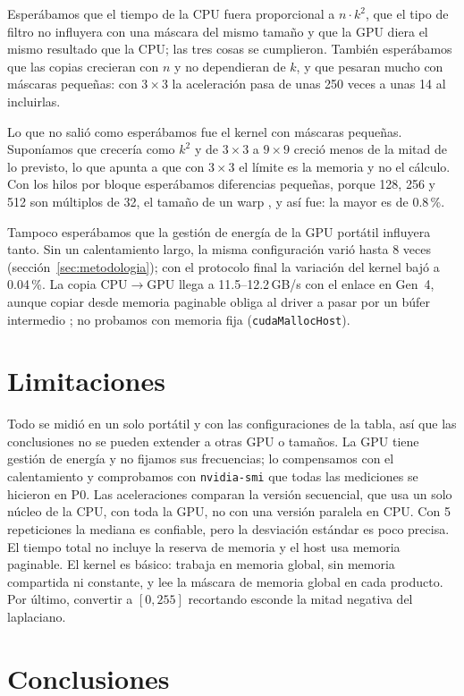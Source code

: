 \documentclass[12pt]{article}
\begin{document}
Esperábamos que el tiempo de la CPU fuera proporcional a $n\cdot k^2$, que el tipo de filtro no
influyera con una máscara del mismo tamaño y que la GPU diera el mismo resultado que la CPU;
las tres cosas se cumplieron. También esperábamos que las copias crecieran con $n$ y no
dependieran de $k$, y que pesaran mucho con máscaras pequeñas: con $3\times3$ la aceleración
pasa de unas 250 veces a unas 14 al incluirlas.

Lo que no salió como esperábamos fue el kernel con máscaras pequeñas. Suponíamos que crecería
como $k^2$ y de $3\times3$ a $9\times9$ creció menos de la mitad de lo previsto, lo que apunta
a que con $3\times3$ el límite es la memoria y no el cálculo. Con los hilos por bloque
esperábamos diferencias pequeñas, porque 128, 256 y 512 son múltiplos de 32, el tamaño de un
warp \cite{cudaguide}, y así fue: la mayor es de 0.8\,\%.

Tampoco esperábamos que la gestión de energía de la GPU portátil influyera tanto. Sin un
calentamiento largo, la misma configuración varió hasta 8 veces (sección~\ref{sec:metodologia});
con el protocolo final la variación del kernel bajó a 0.04\,\%. La copia CPU$\to$GPU llega a
11.5--12.2\,GB/s con el enlace en Gen~4, aunque copiar desde memoria paginable obliga al
driver a pasar por un búfer intermedio \cite{cudaguide}; no probamos con memoria fija
(\texttt{cudaMallocHost}).

\section{Limitaciones}

Todo se midió en un solo portátil y con las configuraciones de la tabla, así que las
conclusiones no se pueden extender a otras GPU o tamaños. La GPU tiene gestión de energía y no
fijamos sus frecuencias; lo compensamos con el calentamiento y comprobamos con
\texttt{nvidia-smi} que todas las mediciones se hicieron en P0. Las aceleraciones comparan la
versión secuencial, que usa un solo núcleo de la CPU, con toda la GPU, no con una versión
paralela en CPU. Con 5 repeticiones la mediana es confiable, pero la desviación estándar es
poco precisa. El tiempo total no incluye la reserva de memoria y el host usa memoria paginable.
El kernel es básico: trabaja en memoria global, sin memoria compartida ni constante, y lee la
máscara de memoria global en cada producto. Por último, convertir a $[0,255]$ recortando
esconde la mitad negativa del laplaciano.

\section{Conclusiones}
\end{document}

